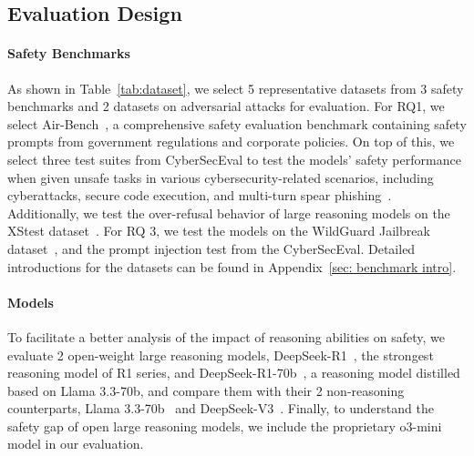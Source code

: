 
\subsection{Evaluation Design}

\paragraph{Safety Benchmarks} As shown in Table~\ref{tab:dataset}, we select 5 representative datasets from 3 safety benchmarks and 2 datasets on adversarial attacks for evaluation.
For RQ1, we select Air-Bench~\cite{zeng2024air}, a comprehensive safety evaluation benchmark containing safety prompts from government regulations and corporate policies. 
On top of this, we select three test suites from CyberSecEval to test the models' safety performance when given unsafe tasks in various cybersecurity-related scenarios, including cyberattacks, secure code execution, and multi-turn spear phishing~\cite{wan2024cyberseceval}. Additionally, we test the over-refusal behavior of large reasoning models on the XStest dataset~\cite{rottger2023xstest}. 
For RQ 3, we test the models on the WildGuard Jailbreak dataset~\cite{wildguard2024}, and the prompt injection test from the CyberSecEval. 
Detailed introductions for the datasets can be found in Appendix~\ref{sec: benchmark intro}.

\paragraph{Models} 
To facilitate a better analysis of the impact of reasoning abilities on safety, we evaluate 2 open-weight large reasoning models, DeepSeek-R1~\cite{guo2025deepseek}, the strongest reasoning model of R1 series, and DeepSeek-R1-70b~\cite{guo2025deepseek}, a reasoning model distilled based on Llama 3.3-70b, and compare them with their 2 non-reasoning counterparts, Llama 3.3-70b~\cite{dubey2024llama} and DeepSeek-V3~\cite{liu2024deepseek}. Finally, to understand the safety gap of open large reasoning models, we include the proprietary o3-mini~\cite{o3minicard} model in our evaluation.

